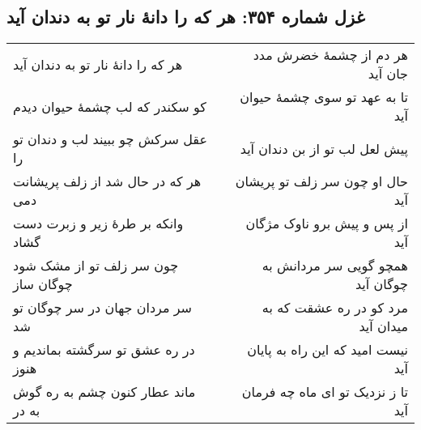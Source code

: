 \begin{center}
\section*{غزل شماره ۳۵۴: هر که را دانهٔ نار تو به دندان آید}
\label{sec:354}
\begin{longtable}{l p{0.5cm} r}
هر که را دانهٔ نار تو به دندان آید
&&
هر دم از چشمهٔ خضرش مدد جان آید
\\
کو سکندر که لب چشمهٔ حیوان دیدم
&&
تا به عهد تو سوی چشمهٔ حیوان آید
\\
عقل سرکش چو ببیند لب و دندان تو را
&&
پیش لعل لب تو از بن دندان آید
\\
هر که در حال شد از زلف پریشانت دمی
&&
حال او چون سر زلف تو پریشان آید
\\
وانکه بر طرهٔ زیر و زبرت دست گشاد
&&
از پس و پیش برو ناوک مژگان آید
\\
چون سر زلف تو از مشک شود چوگان ساز
&&
همچو گویی سر مردانش به چوگان آید
\\
سر مردان جهان در سر چوگان تو شد
&&
مرد کو در ره عشقت که به میدان آید
\\
در ره عشق تو سرگشته بماندیم و هنوز
&&
نیست امید که این راه به پایان آید
\\
ماند عطار کنون چشم به ره گوش به در
&&
تا ز نزدیک تو ای ماه چه فرمان آید
\\
\end{longtable}
\end{center}
